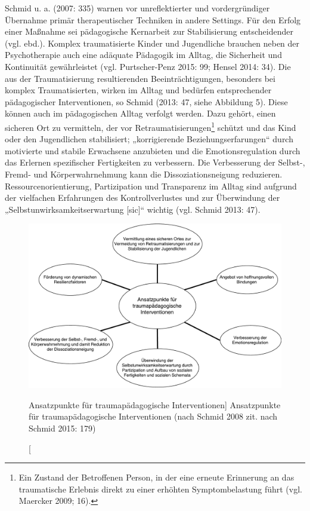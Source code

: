 Schmid u. a. (2007: 335) warnen vor unreflektierter und vordergründiger Übernahme prim{\"a}r therapeutischer Techniken in andere Settings. F{\"u}r den Erfolg einer Maßnahme sei p{\"a}dagogische Kernarbeit zur Stabilisierung entscheidender (vgl. ebd.). Komplex traumatisierte Kinder und Jugendliche brauchen neben der Psychotherapie auch eine adäquate Pädagogik im Alltag, die Sicherheit und Kontinuität gewährleistet (vgl. Purtscher-Penz 2015: 99; Hensel 2014: 34). Die aus der Traumatisierung resultierenden Beeinträchtigungen, besonders bei komplex Traumatisierten, wirken im Alltag und bedürfen entsprechender pädagogischer Interventionen, so Schmid (2013: 47, siehe Abbildung 5). Diese können auch im pädagogischen Alltag verfolgt werden. Dazu gehört, einen sicheren Ort zu vermitteln, der vor Retraumatisierungen\footnote{Ein Zustand der Betroffenen Person, in der eine erneute Erinnerung an das traumatische Erlebnis direkt zu einer erh{\"o}hten Symptombelastung f{\"u}hrt (vgl. Maercker 2009; 16).} schützt und das Kind oder den Jugendlichen stabilisiert; „korrigierende Beziehungserfarungen“ durch motivierte und stabile Erwachsene anzubieten und die Emotionsregulation durch das Erlernen spezifischer Fertigkeiten zu verbessern. Die Verbesserung der Selbst-, Fremd- und Körperwahrnehmung kann die Dissoziationsneigung reduzieren. Ressourcenorientierung, Partizipation und Transparenz im Alltag sind aufgrund der vielfachen Erfahrungen des Kontrollverlustes und zur Überwindung der „Selbstunwirksamkeitserwartung [sic]“ wichtig (vgl. Schmid 2013: 47).

\begin{figure}[h]
  \centering
  \includegraphics[scale=0.5]{abbildung5}
  \caption
      [Ansatzpunkte für traumapädagogische Interventionen]
      {Ansatzpunkte für traumapädagogische Interventionen (nach Schmid 2008 zit. nach Schmid 2015: 179)}
  \label{fig:ansatzpunkte}
\end{figure}


